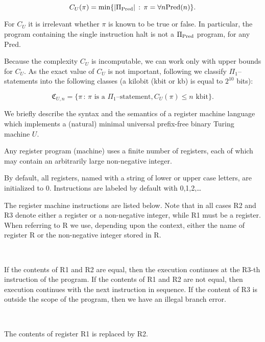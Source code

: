 \documentclass[
aip,
cha,
amssymb
]{revtex4-1}
\def \C{{\mathfrak C}}
\newenvironment{Instruction}[2]%
{
\noindent {\bf #1 \hfill #2} \\[-2ex]
\begin{flushright}\begin{minipage}{\textwidth}
   }%
{\end{minipage}
\end{flushright}}
\begin{document}
\[C_{U}(\pi) = \min \{ |\Pi_{{\rm Pred}}| \,:\,  \pi = \forall n {\rm Pred}(n)\}.\]


For $C_{U}$ it is irrelevant  whether $\pi$ is known to be true or false. In particular, the program containing the  single instruction halt is not a $\Pi_{{\rm Pred}}$ program, for any Pred.

Because the complexity  $C_{U}$ is   incomputable,  we can work only with upper bounds for $C_{U}$. As the exact value
of $C_{U}$ is not important, following \cite{calude-elena-ec2} we classify $\Pi_{1}$--statements into the following classes (a kilobit (kbit or kb) is equal to $2^{10}$ bits):

$$\C_{U,n} = \{\pi \,:\,
\pi \mbox{  is a $\Pi_{1}$--statement}, C_{U}(\pi) \le n \mbox{ kbit} \}.$$


We  briefly describe the syntax  and the semantics
of a register machine  language which  implements a (natural) minimal
universal prefix-free binary Turing machine $U$.

Any register program (machine) uses a finite number of registers, each of which may
contain an arbitrarily large non-negative  integer.

By default, all registers, named with a string of lower or upper
case letters, are initialized to 0.  Instructions are labeled
by default with 0,1,2,\ldots


The register machine  instructions are listed below.
Note that in all cases R2 and R3 denote either a register or a non-negative integer, while R1  must be a
register.  When referring to R we use, depending upon the context, either the name of register R or the non-negative integer stored in R.

\bigskip

\begin{Instruction}{~=R1,R2,R3}{    }%
If the contents of R1 and R2 are equal, then the execution continues
at the R3-th instruction of the program.
If the contents of R1 and R2  are not equal, then execution continues with the next instruction
in sequence. If the content of R3 is outside the scope of the program,
then we have an illegal branch error.

\bigskip

\end{Instruction}

\begin{Instruction}{~\&R1,R2}{      }%
The contents of register R1 is replaced by
 R2.

 \bigskip

\end{Instruction}
\end{document}
